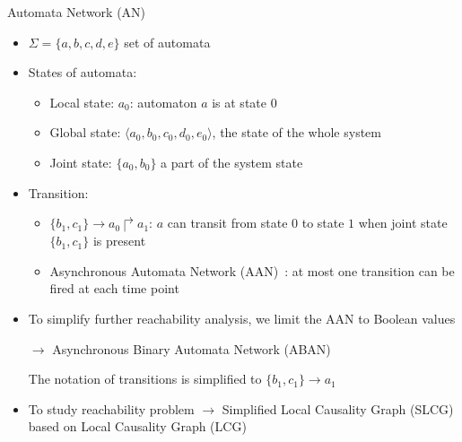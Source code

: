 \documentclass[8pt]{beamer}
\begin{document}
\begin{frame}{Automata Network (AN)}
	
	
	\begin{itemize}
\item<+-> $\Sigma=\{a,b,c,d,e\}$ set of automata 
\item<+-> States of automata: 
\begin{itemize}
    \item<+-> Local state: $a_0$: automaton $a$ is at state $0$
    \item<+-> Global state: $\langle a_0,b_0,c_0,d_0,e_0 \rangle$, the state of the whole system
    \item<+-> Joint state: $\{a_0,b_0\}$ a part of the system state 
\end{itemize}
 
\item<+-> Transition:
\begin{itemize}
    \item<+-> $\{b_1,c_1\}\to a_0\Rsh a_1$: $a$ can transit from state $0$ to state $1$ when joint state $\{b_1,c_1\}$ is present
    \item<+-> Asynchronous Automata Network (AAN)~\cite{folschette2015}: at most one transition can be fired at each time point
\end{itemize}


\item<+-> To simplify further reachability analysis, we limit the AAN to Boolean values
	
	$\to$ Asynchronous Binary Automata Network (ABAN)
    
    The notation of transitions is simplified to $\{b_1,c_1\}\to a_1$
\item<+-> To study reachability problem $\to$ Simplified Local Causality Graph (SLCG) based on Local Causality Graph (LCG)~\cite{pauleve2012}
\end{itemize}
	
\end{frame}
\end{document}
